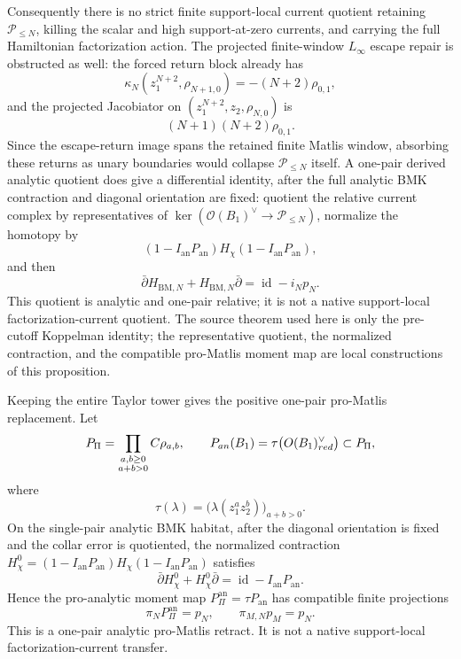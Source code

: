 \documentclass[11pt]{memoir}
\begin{document}
\begin{prop}
  Consequently there is no strict finite support-local current quotient
  retaining \(\mathcal P_{\le N}\), killing the scalar and high
  support-at-zero currents, and carrying the full Hamiltonian
  factorization action.  The projected finite-window \(L_\infty\) escape
  repair is obstructed as well: the forced return block already has
  \[
    \kappa_N(z_1^{N+2},\rho_{N+1,0})=-(N+2)\rho_{0,1},
  \]
  and the projected Jacobiator on
  \((z_1^{N+2},z_2,\rho_{N,0})\) is
  \[
    (N+1)(N+2)\rho_{0,1}.
  \]
  Since the escape-return image spans the retained finite Matlis window,
  absorbing these returns as unary boundaries would collapse
  \(\mathcal P_{\le N}\) itself.  A one-pair derived analytic quotient
  does give a
  differential identity, after the full analytic BMK contraction and
  diagonal orientation are fixed: quotient the relative current complex
  by representatives of
  \(\ker(\mathcal O(B_1)^\vee\to\mathcal P_{\le N})\), normalize the
  homotopy by
  \[
    (1-I_{\mathrm{an}}P_{\mathrm{an}})H_\chi
    (1-I_{\mathrm{an}}P_{\mathrm{an}}),
  \]
  and then
  \[
    \bar\partial H_{\mathrm{BM},N}
    +H_{\mathrm{BM},N}\bar\partial
    =
    \operatorname{id}-i_Np_N .
  \]
  This quotient is analytic and one-pair relative; it is not a native
  support-local factorization-current quotient.  The source theorem used
  here is only the pre-cutoff Koppelman identity; the representative
  quotient, the normalized contraction, and the compatible pro-Matlis
  moment map are local constructions of this proposition.

  Keeping the entire Taylor tower gives the positive one-pair
  pro-Matlis replacement.  Let
  \[
    P_{\Pi}
      =
      \prod_{\substack{a,b\geq0\\a+b>0}}C\rho_{a,b},
    \qquad
    P_{an}(B_1)
      =
      \tau\bigl(O(B_1)^\vee_{red}\bigr)
      \subset P_{\Pi},
  \]
  where
  \[
    \tau(\lambda)
      =
      \bigl(\lambda(z_1^az_2^b)\bigr)_{a+b>0}.
  \]
  On the single-pair analytic BMK habitat, after the diagonal orientation
  is fixed and the collar error is quotiented, the normalized contraction
  \(H_\chi^0=(1-I_{\mathrm{an}}P_{\mathrm{an}})
  H_\chi(1-I_{\mathrm{an}}P_{\mathrm{an}})\) satisfies
  \[
    \bar\partial H_\chi^0+H_\chi^0\bar\partial
    =
    \operatorname{id}-I_{\mathrm{an}}P_{\mathrm{an}}.
  \]
  Hence the pro-analytic moment map
  \(P_{\Pi}^{\mathrm{an}}=\tau P_{\mathrm{an}}\) has compatible finite
  projections
  \[
    \pi_NP_{\Pi}^{\mathrm{an}}=p_N,\qquad
    \pi_{M,N}p_M=p_N .
  \]
  This is a one-pair analytic pro-Matlis retract.  It is not a native
  support-local factorization-current transfer.


\end{prop}
\end{document}
